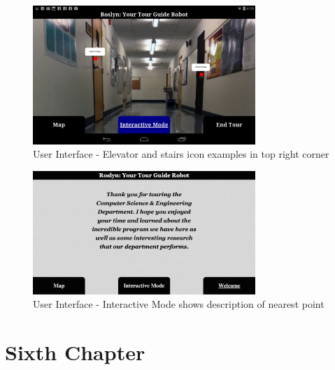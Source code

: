 \documentclass[11pt]{report}
\begin{document}
\begin{figure}[H]
 \centering
 \includegraphics[width=0.75\textwidth]{ui7.png}
 \caption{User Interface - Elevator and stairs icon examples in top right corner}
 \label{fig:ui7}
\end{figure}

\begin{figure}[H]
 \centering
 \includegraphics[width=0.75\textwidth]{ui8.png}
 \caption{User Interface - Interactive Mode shows description of nearest point}
 \label{fig:ui8}
\end{figure}

\chapter{Sixth Chapter}
\label{chap:six}
\end{document}
